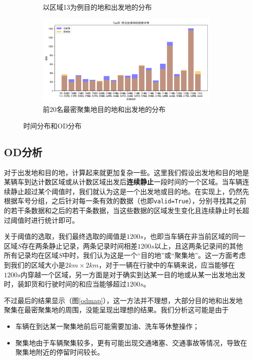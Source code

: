\documentclass[UTF8]{ctexart}
\begin{document}
\begin{figure}[htb]
\begin{subfigure}[b]{0.48\textwidth}
        \caption{以区域13为例目的地和出发地的分布}
        \label{odsimple}
    \end{subfigure}
    \hfill
    \begin{subfigure}[b]{0.48\textwidth}
        \centering
        \includegraphics[width=\textwidth]{../img/OD分布/所有区域出发地和目的地分布.png}
        \caption{前20名最密聚集地目的地和出发地的分布}
        \label{odall}
    \end{subfigure}
    \caption{时间分布和OD分布}
    \label{fig:combined}
\end{figure}

\subsection{OD分析}

对于出发地和目的地，计算起来就更加复杂一些。这里我们假设出发地和目的地是某辆车到达计数区域或从计数区域出发后\textbf{连续静止}一段时间的一个区域。当车辆连续静止超过某个阈值时，我们就认为这是一个出发地或目的地。在实现上，仍然先根据车号分组，之后针对每一条有效的数据（也即\texttt{valid=True}），分别寻找其之前的若干条数据和之后的若干条数据，当这些数据的区域发生变化且连续静止时长超过阈值时进行统计即可。

关于阈值的选取，我们最终选取的阈值是$1200s$，也即当车辆在非当前区域的同一区域$S$存在两条静止记录，两条记录时间相差$1200s$以上，且这两条记录间的其他所有记录均在区域$S$中时，我们认为这是一个“目的地”或“聚集地”。这一方面考虑到我们的区域大小是$2km\times 2km$，对于一辆在行驶中的车辆来说，应当能够在$1200s$内穿越一个区域，另一方面是对于确实到达某一目的地或从某一出发地出发时，装卸货和行驶时间的和应当能够超过$1200s$。

不过最后的结果显示（图\ref{odmap}），这一方法并不理想，大部分目的地和出发地聚集在最密聚集地的周围，没能呈现出理想的结果。我们分析这可能是由于
\begin{itemize}[leftmargin=4em,itemsep=0pt,topsep=2pt]
    \item 车辆在到达某一聚集地前后可能需要加油、洗车等休整操作；
    \item 聚集地由于车辆聚集较多，更有可能出现交通堵塞、交通事故等情况，导致在聚集地附近的停留时间较长。
\end{itemize}
\end{document}
